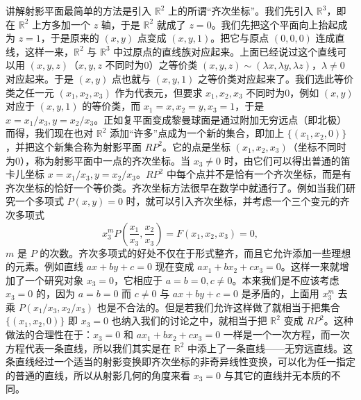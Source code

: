 讲解射影平面最简单的方法是引入 $\mathbb R^2$ 上的所谓“齐次坐标”。我们先引入 $\mathbb R^3$，即在 $\mathbb R^2$ 上方多加一个 $z$ 轴，于是 $\mathbb R^2$ 就成了 $z=0$。我们先把这个平面向上抬起成为 $z=1$，于是原来的 $(x,y)$ 点变成 $(x,y,1)$。把它与原点 $(0,0,0)$ 连成直线，这样一来，$\mathbb R^2$ 与 $\mathbb R^3$ 中过原点的直线族对应起来。上面已经说过这个直线可以用 $(x,y,z)$（$x,y,z$ 不同时为0）之等价类 $(x,y,z)\sim(\lambda x,\lambda y,\lambda z)$，$\lambda\ne0$ 对应起来。于是 $(x,y)$ 点也就与 $(x,y,1)$ 之等价类对应起来了。我们选此等价类之任一元 $(x_1,x_2,x_3)$ 作为代表元，但要求 $x_1,x_2,x_3$ 不同时为0，例如 $(x,y)$ 对应于 $(x,y,1)$ 的等价类，而 $x_1=x,x_2=y,x_3=1$，于是 $x=x_1/x_3,y=x_2/x_3$。正如复平面变成黎曼球面是通过附加无穷远点（即北极）而得，我们现在也对 $\mathbb R^2$ 添加“许多”点成为一个新的集合，即加上 $\{(x_1,x_2,0)\}$，并把这个新集合称为射影平面 $RP^2$。它的点是坐标 $(x_1,x_2,x_3)$（坐标不同时为0），称为射影平面中一点的齐次坐标。当 $x_3\ne0$ 时，由它们可以得出普通的笛卡儿坐标 $x=x_1/x_3,y=x_2/x_3$。$RP^2$ 中每个点并不是恰有一个齐次坐标，而是有齐次坐标的恰好一个等价类。齐次坐标方法很早在数学中就通行了。例如当我们研究一个多项式 $P(x,y)=0$ 时，就可以引入齐次坐标，并考虑一个三个变元的齐次多项式
\[
 x_3^m P\left(\frac{x_1}{x_3},\frac{x_2}{x_3}\right)=F(x_1,x_2,x_3)=0,
\]
$m$ 是 $P$ 的次数。齐次多项式的好处不仅在于形式整齐，而且它允许添加一些理想的元素。例如直线 $ax+by+c=0$ 现在变成 $ax_1+bx_2+cx_3=0$。这样一来就增加了一个研究对象 $x_3=0$，它相应于 $a=b=0,c\ne0$。本来我们是不应该考虑 $x_3=0$ 的，因为 $a=b=0$ 而 $c\ne0$ 与 $ax+by+c=0$ 是矛盾的，上面用 $x_3^m$ 去乘 $P(x_1/x_3,x_2/x_3)$ 也是不合法的。但是若我们允许这样做了就相当于把集合 $\{(x_1,x_2,0)\}$ 即 $x_3=0$ 也纳入我们的讨论之中，就相当于把 $\mathbb R^2$ 变成 $RP^2$。这种做法的合理性在于：$x_3=0$ 和 $ax_1+bx_2+cx_3=0$ 一样是一个一次方程，而一次方程代表一条直线，所以我们其实是在 $\mathbb R^2$ 中添上了一条直线——无穷远直线。这条直线经过一个适当的射影变换即齐次坐标的非奇异线性变换，可以化为任一指定的普通的直线，所以从射影几何的角度来看 $x_3=0$ 与其它的直线并无本质的不同。

